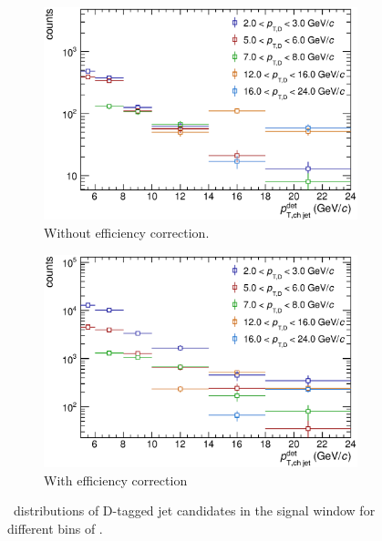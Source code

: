 \begin{figure}[tbh]
\centering
\begin{subfigure}{0.49\textwidth}
  \centering
  \includegraphics[width=1.0\linewidth]{img/HQ16_Simulation_SigSpectra}
  \caption{Without efficiency correction.}
\end{subfigure}
\begin{subfigure}{0.49\textwidth}
  \centering
  \includegraphics[width=1.0\linewidth]{img/HQ16_Simulation_SigSpectra_Eff}
  \caption{With efficiency correction}
\end{subfigure}
\caption{\ptchjetdet\ distributions of D-tagged jet candidates in the signal window for different bins of \ptd.}
\label{fig:SigSpectra}
\end{figure}

